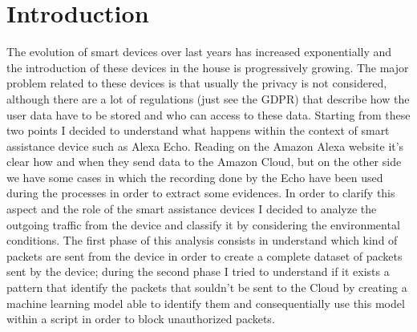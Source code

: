 \documentclass[sigconf]{acmart}
\begin{document}
    \maketitle


    \section{Introduction}
    The evolution of smart devices over last years has increased exponentially and the introduction of these devices in the house is progressively growing.
    The major problem related to these devices is that usually the privacy is not considered, although there are a lot of regulations (just see the GDPR) that describe how the user data have to be stored and who can access to these data.
    Starting from these two points I decided to understand what happens within the context of smart assistance device such as Alexa Echo.
    Reading on the Amazon Alexa website it's clear how and when they send data to the Amazon Cloud, but on the other side we have some cases in which the recording done by the Echo have been used during the processes in order to extract some evidences.
    In order to clarify this aspect and the role of the smart assistance devices I decided to analyze the outgoing traffic from the device and classify it by considering the environmental conditions.
    The first phase of this analysis consists in understand which kind of packets are sent from the device in order to create a complete dataset of packets sent by the device; during the second phase I tried to understand if it exists a pattern that identify the packets that souldn't be sent to the Cloud by creating a machine learning model able to identify them and consequentially use this model within a script in order to block unauthorized packets.
\end{document}
